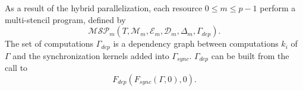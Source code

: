 As a result of the hybrid parallelization, each resource $0 \leq m \leq p-1$ perform a multi-stencil program, defined by
\begin{equation*}
\mathcal{MSP}_m(T,\mathcal{M}_m,\mathcal{E}_m,\mathcal{D}_m,\Delta_m,\Gamma_{dep}).
\end{equation*}
The set of computations $\Gamma_{dep}$ is a dependency graph between computations $k_i$ of $\Gamma$ and the synchronization kernels added into $\Gamma_{sync}$. $\Gamma_{dep}$ can be built from the call to 
\begin{equation*}
F_{dep}(F_{sync}(\Gamma,0),0).
\end{equation*}

